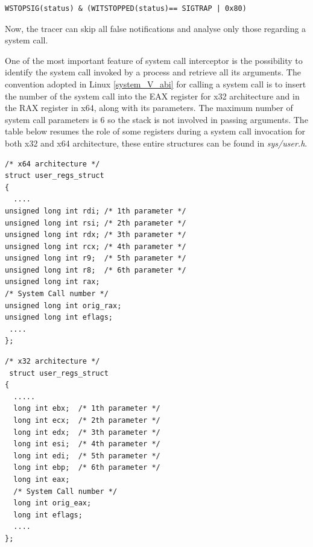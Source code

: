 \begin{center}
\begin{lstlisting}[caption={Condition that identifies exclusively system call entry and exit}]
									WSTOPSIG(status) & (WITSTOPPED(status)== SIGTRAP | 0x80)
\end{lstlisting}
\end{center}

Now, the tracer can skip all false notifications and analyse only those regarding a system call. 

One of the most important feature of system call interceptor is the possibility to identify the system call invoked by a process and retrieve all its arguments. The convention adopted in Linux \ref{system_V_abi} for calling a system call is to insert the number of the system call into the EAX register for x32 architecture and in the RAX register in x64, along with its parameters. The maximum number of system call parameters is 6 so the stack is not involved in passing arguments. The table below resumes the role of some registers during a system call invocation for both x32 and x64 architecture, these entire structures can be found in \emph{sys/user.h}. 

\begin{multicols}{2}

\begin{center}
\begin{lstlisting}[caption={Linux structures representing the general purpose registers of x64 CPU}]
/* x64 architecture */				
struct user_regs_struct				
{                                 
  ....                                         
unsigned long int rdi; /* 1th parameter */
unsigned long int rsi; /* 2th parameter */		
unsigned long int rdx; /* 3th parameter */       
unsigned long int rcx; /* 4th parameter */   
unsigned long int r9;  /* 5th parameter */     		
unsigned long int r8;  /* 6th parameter */   
unsigned long int rax;  
/* System Call number */
unsigned long int orig_rax;			   
unsigned long int eflags;            
 ....   
};                                 
\end{lstlisting}
\end{center}

\begin{center}
\begin{lstlisting}[caption={Linux structure representing the general purpose registers of x32 CPU}]
/* x32 architecture */				                                
 struct user_regs_struct
{
  .....
  long int ebx;	 /* 1th parameter */
  long int ecx;  /* 2th parameter */
  long int edx;  /* 3th parameter */
  long int esi;  /* 4th parameter */
  long int edi;  /* 5th parameter */
  long int ebp;  /* 6th parameter */
  long int eax;
  /* System Call number */
  long int orig_eax; 
  long int eflags;
  .... 
};                                 
\end{lstlisting}
\end{center}
\end{multicols}

